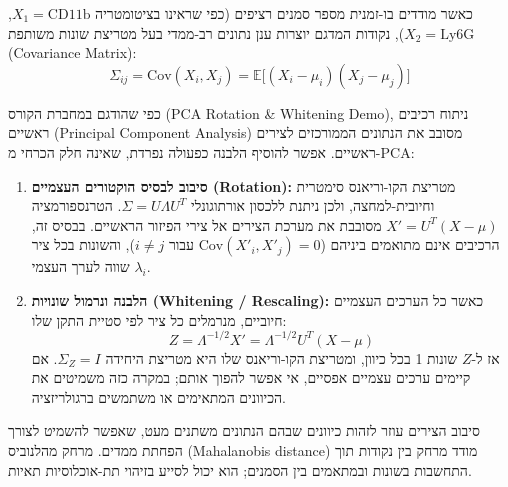 כאשר מודדים בו-זמנית מספר סמנים רציפים (כפי שראינו בציטומטריה $X_1 = \text{CD11b}$, $X_2 = \text{Ly6G}$), נקודות המדגם יוצרות ענן נתונים רב-ממדי בעל מטריצת שונות משותפת (\textenglish{Covariance Matrix}):
\begin{equation}\label{eq:cov-matrix}
\Sigma_{ij} = \mathrm{Cov}(X_i, X_j) = \mathbb{E}\bigl[(X_i - \mu_i)(X_j - \mu_j)\bigr]
\end{equation}

כפי שהודגם במחברת הקורס (\textenglish{PCA Rotation \& Whitening Demo}), ניתוח רכיבים ראשיים (\textenglish{Principal Component Analysis}) מסובב את הנתונים הממורכזים לצירים ראשיים. אפשר להוסיף הלבנה כפעולה נפרדת, שאינה חלק הכרחי מ-PCA:
\begin{enumerate}
\item \textbf{סיבוב לבסיס הוקטורים העצמיים (\textenglish{Rotation}):}
מטריצת הקו-וריאנס סימטרית וחיובית-למחצה, ולכן ניתנת ללכסון אורתוגונלי $\Sigma = U \Lambda U^T$.
הטרנספורמציה $X' = U^T (X - \mu)$ מסובבת את מערכת הצירים אל צירי הפיזור הראשיים. בבסיס זה, הרכיבים אינם מתואמים ביניהם ($\mathrm{Cov}(X'_i, X'_j) = 0$ עבור $i \ne j$), והשונות בכל ציר שווה לערך העצמי $\lambda_i$.
\item \textbf{הלבנה ונרמול שונויות (\textenglish{Whitening / Rescaling}):}
כאשר כל הערכים העצמיים חיוביים, מנרמלים כל ציר לפי סטיית התקן שלו:
\begin{equation}\label{eq:whitening}
Z = \Lambda^{-1/2} X' = \Lambda^{-1/2} U^T (X - \mu)
\end{equation}
אז ל-$Z$ שונות 1 בכל כיוון, ומטריצת הקו-וריאנס שלו היא מטריצת היחידה $\Sigma_Z = I$. אם קיימים ערכים עצמיים אפסיים, אי אפשר להפוך אותם; במקרה כזה משמיטים את הכיוונים המתאימים או משתמשים ברגולריזציה.
\end{enumerate}
סיבוב הצירים עוזר לזהות כיוונים שבהם הנתונים משתנים מעט, שאפשר להשמיט לצורך הפחתת ממדים. מרחק מהלנוביס (\textenglish{Mahalanobis distance}) מודד מרחק בין נקודות תוך התחשבות בשונות ובמתאמים בין הסמנים; הוא יכול לסייע בזיהוי תת-אוכלוסיות תאיות.

